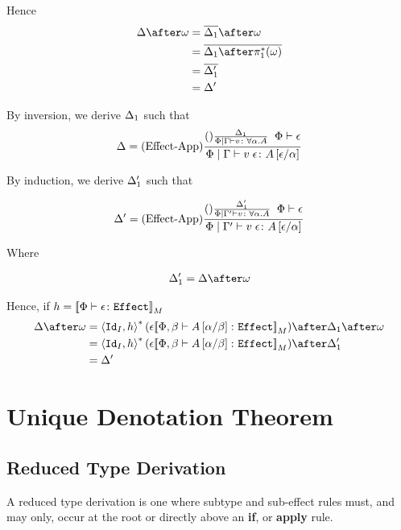 \documentclass{report}
\begin{document}
    Hence \begin{align}
        \D\after\w & = \bar{\D_1}\after\w\\
        & = \bar{\D_1\after\pstar(\w)}\\
        & = \bar{\D_1'}\\
        & = \D'
    \end{align}
    
    By inversion, we derive $\Delta_1$ such that
    \begin{equation}
        \Delta = (\text{Effect-App}) \frac{(\text{}) \frac{\Delta_1}{\Phi\mid\Gamma \vdash v \colon \forall \alpha. A}\;\;\Phi\vdash \epsilon}{\Phi\mid\Gamma \vdash v\;\epsilon \colon A\left[\epsilon / \alpha\right]}
    \end{equation}
    
    By induction, we derive $\Delta_1'$ such that
    
    \begin{equation}
        \Delta' = (\text{Effect-App}) \frac{(\text{}) \frac{\Delta_1'}{\Phi\mid\Gamma' \vdash v \colon \forall \alpha. A}\;\;\Phi\vdash \epsilon}{\Phi\mid\Gamma' \vdash v\;\epsilon \colon A\left[\epsilon / \alpha\right]}
    \end{equation}
    
    Where 
    
    \begin{align}
        \D_1' = \D\after\w
    \end{align}
    
    
    
    Hence, if $h = {\bf [\![}\Phi \vdash \epsilon \colon \texttt{Effect}{\bf ]\!]}_M$
    \begin{align}
        \D\after\w &= \pr{\Id{I}}{h}\star(\e{\deno{\typerelation{\P,\b}{A\ssub{\b}{\a}}{\effect}}})\after\D_1\after\w\\
        &= \pr{\Id{I}}{h}\star(\e{\deno{\typerelation{\P,\b}{A\ssub{\b}{\a}}{\effect}}})\after\D_1'\\
        & = \D'
    \end{align}
    
\chapter{Unique Denotation Theorem}

\section{Reduced Type Derivation}
    A reduced type derivation is one where subtype and sub-effect rules must, and may only, occur at the root or directly above an \textbf{if}, or \textbf{apply} rule.
\end{document}

